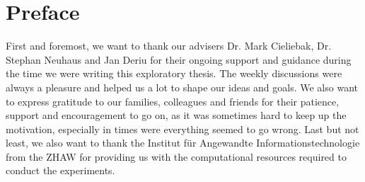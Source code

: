 \chapter*{Preface}
First and foremost, we want to thank our advisers Dr. Mark Cieliebak, Dr. Stephan Neuhaus and Jan Deriu for their ongoing support and guidance during the time we were writing this exploratory thesis. The weekly discussions were always a pleasure and helped us a lot to shape our ideas and goals. We also want to express gratitude to our families, colleagues and friends for their patience, support and encouragement to go on, as it was sometimes hard to keep up the motivation, especially in times were everything seemed to go wrong. Last but not least, we also want to thank the Institut für Angewandte Informationstechnologie from the ZHAW for providing us with the computational resources required to conduct the experiments.
